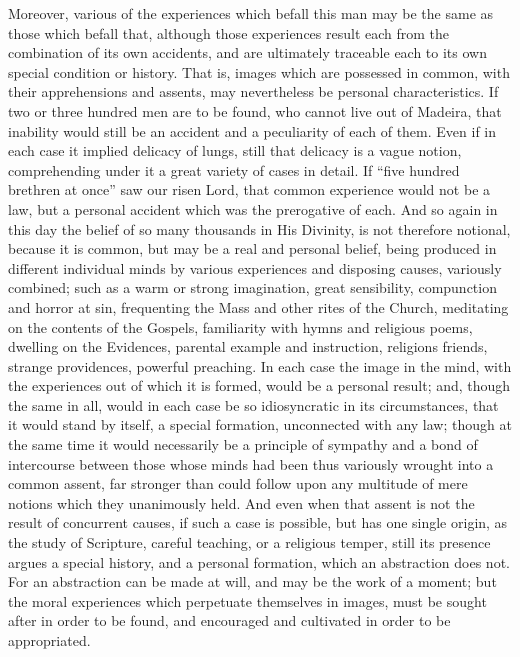 Moreover, various of the experiences which befall this man may be
the same as those which befall that, although those experiences result
each from the combination of its own accidents, and are ultimately
traceable each to its own special condition or history. That is,
images which are possessed in common, with their apprehensions and
assents, may nevertheless be personal characteristics. If two or three
hundred men are to be found, who cannot live out of Madeira, that
inability would still be an accident and a peculiarity of each of
them. Even if in each case it implied delicacy of lungs, still that
delicacy is a vague notion, comprehending under it a great variety of
cases in detail. If ``five hundred brethren at once'' saw our
risen Lord, that common experience would not be a law, but a personal
accident which was the prerogative of each. And so again in this day
the belief of so many thousands in His Divinity, is not therefore
notional, because it is common, but may be a real and personal belief,
being produced in different individual minds by various experiences
and disposing causes, variously combined; such as a warm or strong
imagination, great sensibility, compunction and horror at sin,
frequenting the Mass and other rites of the Church, meditating on the
contents of the Gospels, familiarity with hymns and religious poems,
dwelling on the Evidences, parental example and instruction, religions
friends, strange providences, powerful preaching. In each case the
image in the mind, with the experiences out of which it is formed,
would be a personal result; and, though the same in all, would in each
case be so idiosyncratic in its circumstances, that it would stand by
itself, a special formation, unconnected with any law; though at the
same time it would necessarily be a principle of sympathy and a bond
of intercourse between those whose minds had been thus variously
wrought into a common assent, far stronger than could follow upon any
multitude of mere notions which they unanimously held. And even when
that assent is not the result of concurrent causes, if such a case is
possible, but has one single origin, as the study of Scripture,
careful teaching, or a religious temper, still its presence argues a
special history, and a personal formation, which an abstraction does
not. For an abstraction can be made at will, and may be the work of a
moment; but the moral experiences which perpetuate themselves in
images, must be sought after in order to be found, and encouraged and
cultivated in order to be appropriated.

